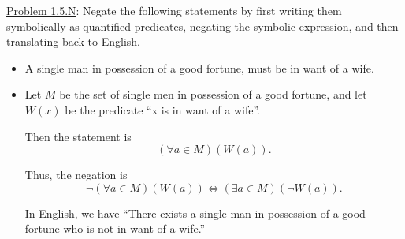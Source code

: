 \documentclass{article}
\theoremstyle{definition}
\begin{document}
	\vspace{.5cm}


	\noindent \underline{Problem 1.5.N}: Negate the following statements by first writing them symbolically as quantified predicates, negating the symbolic expression, and then translating back to English.
	\begin{itemize}

		\item[(3)] A single man in possession of a good fortune, must be in want of a wife.

	\end{itemize}

	\vspace{0.25cm}
	\begin{itemize}

		\item[(3)] Let $M$ be the set of single men in possession of a good fortune, and let $W(x)$  be the predicate ``x is in want of a wife''.

		Then the statement is $$(\forall a\in M)(W(a)).$$

		Thus, the negation is $$\neg (\forall a\in M)(W(a)) \Leftrightarrow (\exists a\in M)(\neg W(a)).$$

		In English, we have ``There exists a single man in possession of a good fortune who is not in want of a wife.''

	\end{itemize}
\end{document}
